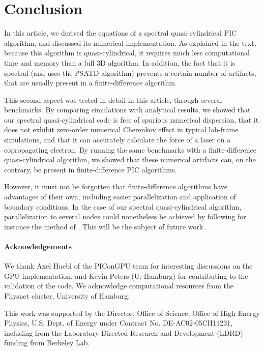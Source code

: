 \documentclass[1p,times]{elsarticle}
\begin{document}
\section*{Conclusion}

In this article, we derived the equations of a spectral
quasi-cylindrical PIC algorithm, and discussed its numerical
implementation. As explained in the text, because this algorithm is
quasi-cylindrical, it requires much less computational
time and memory than a full 3D algorithm. In addition, the fact
that it is spectral (and uses the PSATD algorithm) prevents a certain number of
artifacts, that are usually present in a finite-difference algorithm.

This second aspect was tested in detail in this article, through
several benchmarks. By comparing simulations with analytical results, 
we showed that our spectral quasi-cylindrical code is free of
spurious numerical dispersion, that it does not exhibit zero-order 
numerical Cherenkov effect in typical lab-frame
simulations, and that it can accurately calculate the force of a
laser on a copropagating electron. By running the
same benchmarks with a finite-difference quasi-cylindrical algorithm, we showed that
these numerical artifacts can, on the contrary, be present in
finite-difference PIC algorithms. 

However, it must not be forgotten that
finite-difference algorithms have advantages of their own, including
easier parallelization and application of boundary conditions. In the
case of our spectral quasi-cylindrical algorithm, parallelization to
several nodes could nonetheless be achieved by following for instance the
method of \cite{VayJCP2013}. This will be the subject of future work. 

\paragraph{Acknowledgements}

We thank Axel Huebl of the PIConGPU team \cite{PIConGPU} for
interesting discussions on the GPU implementation, and Kevin Peters
(U. Hamburg) for contributing to the validation of the code.
We acknowledge computational resources from the Physnet cluster, 
University of Hamburg.

This work was supported by the Director, Office of Science, Office of High Energy Physics, U.S. Dept. of Energy under Contract No. DE-AC02-05CH11231, including from the Laboratory Directed Research and Development (LDRD) funding from Berkeley Lab.
\end{document}
